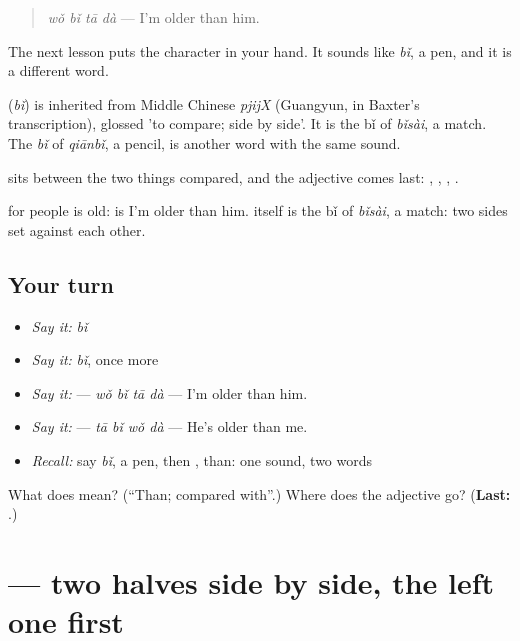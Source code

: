 \begin{quote}
\textbf{} \emph{wǒ bǐ tā dà} — I'm older than him.
\end{quote}

The next lesson puts the character in your hand. It sounds like \emph{bǐ}, a pen, and it is a different word.

\begin{cousinweb}
\textbf{} (\emph{bǐ}) is inherited from Middle Chinese \emph{pjijX} (Guangyun, in Baxter's transcription), glossed 'to compare; side by side'. It is the bǐ of \emph{bǐsài}, a match. The \emph{bǐ} of \emph{qiānbǐ}, a pencil, is another word with the same sound.
\end{cousinweb}

\begin{grammarlens}[title={What you've built}]
 sits between the two things compared, and the adjective comes last: , , , .

 for people is old:  is I'm older than him.  itself is the bǐ of \emph{bǐsài}, a match: two sides set against each other.
\end{grammarlens}

\subsection*{Your turn}
\begin{itemize}
\raggedright
  \item \emph{Say it:} \emph{bǐ}
  \item \emph{Say it:} \emph{bǐ}, once more
  \item \emph{Say it:}  — \emph{wǒ bǐ tā dà} — I'm older than him.
  \item \emph{Say it:}  — \emph{tā bǐ wǒ dà} — He's older than me.
  \item \emph{Recall:} say \emph{bǐ}, a pen, then , than: one sound, two words
\end{itemize}

\begin{tcolorbox}[breakable,colback=teal!4,colframe=teal!35!black,title={Before you move on}]
What does  mean? (\textquotedblleft{}Than; compared with\textquotedblright{}.) Where does the adjective go? (\textbf{Last: }.)
\end{tcolorbox}
\section[\texorpdfstring{\zh{比} (bǐ)}{比 (bǐ)}]{ — two halves side by side, the left one first}

